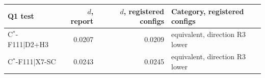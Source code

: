 \begin{tabular}{@{}lrrl@{}}\toprule
Q1 test & $d$, report & $d$, registered configs & Category, registered configs \\\midrule
C$^*$-F111|D2+H3 & 0.0207 & 0.0209 & equivalent, direction R3 lower \\
C$^*$-F111|X7-SC & 0.0243 & 0.0245 & equivalent, direction R3 lower \\
\bottomrule\end{tabular}
